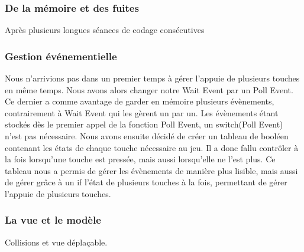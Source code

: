 	\subsubsection{De la mémoire et des fuites}

Après plusieurs longues séances de codage consécutives

	\subsubsection{Gestion événementielle}
	
	Nous n'arrivions pas dans un premier temps à gérer l'appuie de plusieurs touches en même temps. Nous avons alors changer notre Wait Event par un Poll Event. Ce dernier a comme avantage de garder en mémoire plusieurs évènements, contrairement à Wait Event qui les gèrent un par un. Les évènements étant stockés dès le premier appel de la fonction Poll Event, un switch(Poll Event) n'est pas nécessaire. Nous avons ensuite décidé de créer un tableau de booléen contenant les états de chaque touche nécessaire au jeu. Il a donc fallu contrôler à la fois lorsqu'une touche est pressée, mais aussi lorsqu'elle ne l'est plus. Ce tableau nous a permis de gérer les évènements de manière plus lisible, mais aussi de gérer grâce à un if l'état de plusieurs touches à la fois, permettant de gérer l'appuie de plusieurs touches. 

	\subsubsection{La vue et le modèle}
Collisions et vue déplaçable.
